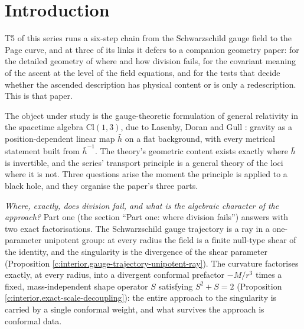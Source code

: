 \documentclass[11pt]{article}
\theoremstyle{definition}
\theoremstyle{plain}
\providecommand{\Cl}{}\renewcommand{\Cl}{\mathrm{Cl}}
\providecommand{\hb}{}\renewcommand{\hb}{\bar{h}}
\begin{document}
\noindent{}
\newpage

\section{Introduction}

\label{c:note.interior.setting-introduction}
T5 of this series \cite{ButlerT5} runs a six-step chain from the Schwarzschild gauge field to the Page curve, and at three of its links it defers to a companion geometry paper: for the detailed geometry of where and how division fails, for the covariant meaning of the ascent at the level of the field equations, and for the tests that decide whether the ascended description has physical content or is only a redescription. This is that paper.

The object under study is the gauge-theoretic formulation of general relativity in the spacetime algebra $\Cl(1,3)$, due to Lasenby, Doran and Gull \cite{LDG1998}: gravity as a position-dependent linear map $\hb$ on a flat background, with every metrical statement built from $\hb^{-1}$. The theory's geometric content exists exactly where $\hb$ is invertible, and the series' transport principle \cite{ButlerT1} is a general theory of the loci where it is not. Three questions arise the moment the principle is applied to a black hole, and they organise the paper's three parts.

\emph{Where, exactly, does division fail, and what is the algebraic character of the approach?} Part one (the section ``Part one: where division fails'') answers with two exact factorisations. The Schwarzschild gauge trajectory is a ray in a one-parameter unipotent group: at every radius the field is a finite null-type shear of the identity, and the singularity is the divergence of the shear parameter (Proposition \ref{c:interior.gauge-trajectory-unipotent-ray}). The curvature factorises exactly, at every radius, into a divergent conformal prefactor $-M/r^3$ times a fixed, mass-independent shape operator $S$ satisfying $S^2 + S = 2$ (Proposition \ref{c:interior.exact-scale-decoupling}): the entire approach to the singularity is carried by a single conformal weight, and what survives the approach is conformal data.
\end{document}
